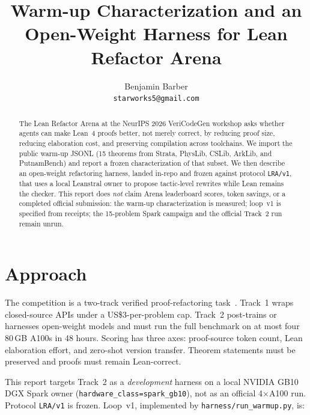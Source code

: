 \documentclass{article}
\title{Warm-up Characterization and an Open-Weight Harness for Lean Refactor Arena}
\author{%
  Benjamin Barber \\
  \texttt{starworks5@gmail.com} \\
}
\begin{document}
\maketitle

\begin{abstract}
The Lean Refactor Arena at the NeurIPS 2026 VeriCodeGen workshop asks whether agents can make Lean~4 proofs better, not merely correct, by reducing proof size, reducing elaboration cost, and preserving compilation across toolchains. We import the public warm-up JSONL (15 theorems from Strata, PhysLib, CSLib, ArkLib, and PutnamBench) and report a frozen characterization of that subset. We then describe an open-weight refactoring harness, landed in-repo and frozen against protocol \texttt{LRA/v1}, that uses a local Leanstral owner to propose tactic-level rewrites while Lean remains the checker. This report does \emph{not} claim Arena leaderboard scores, token savings, or a completed official submission: the warm-up characterization is measured; loop~v1 is specified from receipts; the 15-problem Spark campaign and the official Track~2 run remain unrun.
\end{abstract}

\section{Approach}

The competition is a two-track verified proof-refactoring task~\cite{vericodegen2026,leanrefactorarena,leanrefactorsite}. Track~1 wraps closed-source APIs under a US\$3-per-problem cap. Track~2 post-trains or harnesses open-weight models and must run the full benchmark on at most four 80\,GB A100s in 48 hours. Scoring has three axes: proof-source token count, Lean elaboration effort, and zero-shot version transfer. Theorem statements must be preserved and proofs must remain Lean-correct.

This report targets Track~2 as a \emph{development} harness on a local NVIDIA GB10 DGX Spark owner (\texttt{hardware\_class=spark\_gb10}), not as an official 4$\times$A100 run. Protocol \texttt{LRA/v1} is frozen. Loop~v1, implemented by \texttt{harness/run\_warmup.py}, is:
\end{document}
